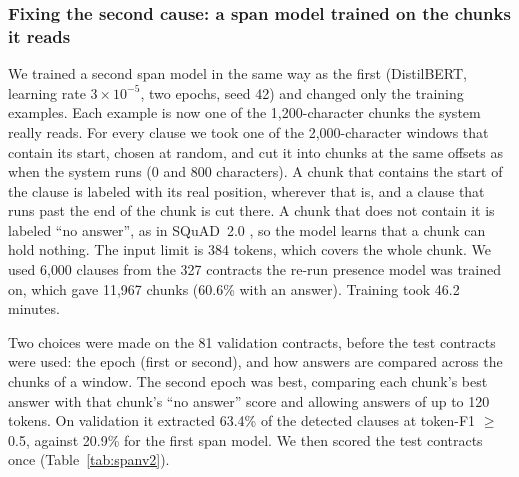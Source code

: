\subsubsection{Fixing the second cause: a span model trained on the chunks it reads}
\label{sec:spanv2}
We trained a second span model in the same way as the first (DistilBERT, learning rate $3\times10^{-5}$, two epochs, seed 42) and changed only the training examples. Each example is now one of the 1{,}200-character chunks the system really reads. For every clause we took one of the 2{,}000-character windows that contain its start, chosen at random, and cut it into chunks at the same offsets as when the system runs (0 and 800 characters). A chunk that contains the start of the clause is labeled with its real position, wherever that is, and a clause that runs past the end of the chunk is cut there. A chunk that does not contain it is labeled ``no answer'', as in SQuAD~2.0 \cite{rajpurkar2018squad2}, so the model learns that a chunk can hold nothing. The input limit is 384 tokens, which covers the whole chunk. We used 6{,}000 clauses from the 327 contracts the re-run presence model was trained on, which gave 11{,}967 chunks (60.6\% with an answer). Training took 46.2 minutes.

Two choices were made on the 81 validation contracts, before the test contracts were used: the epoch (first or second), and how answers are compared across the chunks of a window. The second epoch was best, comparing each chunk's best answer with that chunk's ``no answer'' score and allowing answers of up to 120 tokens. On validation it extracted 63.4\% of the detected clauses at token-F1 $\geq$ 0.5, against 20.9\% for the first span model. We then scored the test contracts once (Table~\ref{tab:spanv2}).

